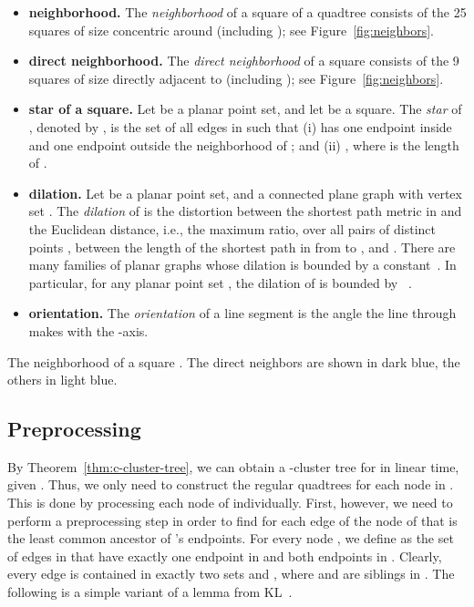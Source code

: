 \documentclass[11pt]{paper}
\begin{document}
\begin{itemize}
\item \textbf{neighborhood.}
The \emph{neighborhood} of a square  of a quadtree
consists of the 25 squares of size  concentric around
 (including ); see Figure~\ref{fig:neighbors}.
\item \textbf{direct neighborhood.}
The \emph{direct neighborhood} of a square
 consists of the 9 squares of size  directly adjacent to 
(including ); see Figure~\ref{fig:neighbors}.
\item \textbf{star of a square.}
Let  be a planar point set, and let  be a square. The \emph{star}
of , denoted by , is the set of all edges  in 
such that (i)  has one endpoint inside  and one endpoint outside the
neighborhood of ; and (ii) , where  is
the length of .
\item \textbf{dilation.}
Let  be a planar point set, and  a connected plane graph with
vertex set . The \emph{dilation} of  is the distortion between
the shortest path metric in  and the Euclidean distance, i.e.,
the maximum ratio, over all pairs of distinct points , between
the length of the shortest path in  from  to , and . There
are many families of planar graphs whose dilation is bounded by a
constant~\cite{DasJo89}.
In particular, for any planar point set , the
dilation of  is bounded
by ~\cite{KeilGu92}.
\item \textbf{orientation.}
The \emph{orientation} of a line segment  is the angle
the line through  makes with the -axis.
\end{itemize}

 {The neighborhood of a square . The direct neighbors
are shown in dark blue, the others in light blue.}

\subsection{Preprocessing}
\label{sec:dt->c-cluster-preprocess}

By Theorem~\ref{thm:c-cluster-tree}, we can obtain a -cluster
tree  for  in linear time, given . Thus, we only
need to construct the regular quadtrees  for each node 
 in . This is done by processing each node of 
individually. First, however, we need to perform a preprocessing step
in order to find  for each edge  of  the node of  
that is the least common ancestor of 's endpoints.
For every node , we define  as the
set of edges in  that have exactly one endpoint in
 and both endpoints in . Clearly, every edge is
contained in exactly two sets  and ,
where  and  are siblings in .
The following is a simple variant of a lemma from
KL~\cite[Lemma~3]{KrznaricLe98}.
\end{document}
